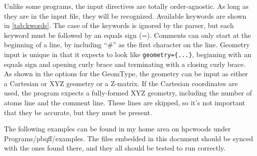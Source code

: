\documentclass{article}
\begin{document}
Unlike some programs, the input directives are totally
order-agnostic. As long as they are in the input file, they will be
recognized. Available keywords are shown in \autoref{tab:kwords}.
The case of the keywords is ignored by the parser, but each keyword
must be followed by an equals sign (=). Comments can only start at the
beginning of a line, by including ``\#'' as the first character on the
line. Geometry input is unique in that it expects to look like
\verb!geometry={...}!, beginning with an equals sign and opening curly
brace and terminating with a closing curly brace. As shown in the
options for the GeomType, the geometry can be input as either a
Cartesian or XYZ geometry or a Z-matrix. If the Cartesian coordinates
are used, the program expects a fully-formed XYZ geometry, including
the number of atoms line and the comment line. These lines are
skipped, so it's not important that they be accurate, but they must be
present.

The following examples can be found in my home area on hpcwoods under
Programs/pbqff/examples. The files embedded in this document should be
synced with the ones found there, and they all should be tested to run
correctly. 
\end{document}
